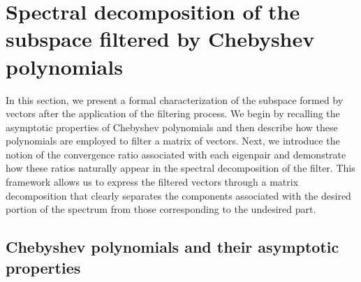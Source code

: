 \section{Spectral decomposition of the subspace filtered by Chebyshev polynomials}
\label{sec-2}
In this section, we present a formal characterization of the subspace formed by vectors after the application of the filtering process. We begin by recalling the asymptotic properties of Chebyshev polynomials and then describe how these polynomials are employed to filter a matrix of vectors. Next, we introduce the notion of the convergence ratio associated with each eigenpair and demonstrate how these ratios naturally appear in the spectral decomposition of the filter. This framework allows us to express the filtered vectors through a matrix decomposition that clearly separates the components associated with the desired portion of the spectrum from those corresponding to the undesired part.


\subsection{Chebyshev polynomials and their asymptotic properties}
\label{sec-2-2}

